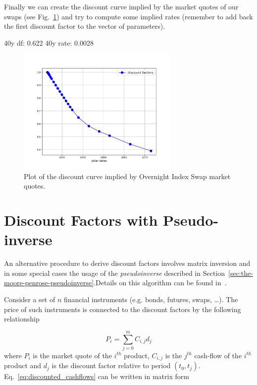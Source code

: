 Finally we can create the discount curve implied by the market quotes of our swaps (see Fig.~\ref{fig:discount_curve}) and try to compute some implied rates (remember to add back the first discount factor to the vector of parameters).

\begin{ioutput}
40y df: 0.622
40y rate: 0.0028
\end{ioutput}

\begin{figure}[htb]
	\centering
	\includegraphics[width=0.7\textwidth]{figures/example_discount_curve}
	\caption{Plot of the discount curve implied by Overnight Index Swap market quotes.}
	\label{fig:discount_curve}
\end{figure}

\section{Discount Factors with Pseudo-inverse}
An alternative procedure to derive discount factors involves matrix inversion and in some special cases the usage of the \emph{pseudoinverse} described in Section~\ref{sec:the-moore-penrose-pseudoinverse}.Details on this algorithm can be found in~\cite{bib:boostrap_pseudoinv}.

Consider a set of $n$ financial instruments (e.g. bonds, futures, swaps, \ldots). The price of such instruments is connected to the discount factors by the following relationship

\begin{equation}
P_i = \sum_{j=0}^{m} C_{i,j} d_j
\label{eq:discounted_cashflows}
\end{equation}
where $P_i$ is the market quote of the $i^{th}$ product, $C_{i,j}$ is the $j^{th}$ cash-flow of the $i^{th}$ product and $d_j$ is the discount factor relative to period $(t_0, t_j)$.
Eq.~\ref{eq:discounted_cashflows} can be written in matrix form


